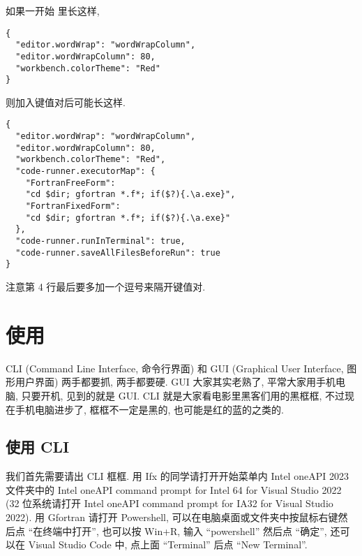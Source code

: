 如果一开始  里长这样,
\begin{verbatim}
{
  "editor.wordWrap": "wordWrapColumn",
  "editor.wordWrapColumn": 80,
  "workbench.colorTheme": "Red"
}
\end{verbatim}
则加入键值对后可能长这样.
\begin{verbatim}
{
  "editor.wordWrap": "wordWrapColumn",
  "editor.wordWrapColumn": 80,
  "workbench.colorTheme": "Red",
  "code-runner.executorMap": {
    "FortranFreeForm":
    "cd $dir; gfortran *.f*; if($?){.\a.exe}",
    "FortranFixedForm":
    "cd $dir; gfortran *.f*; if($?){.\a.exe}"
  },
  "code-runner.runInTerminal": true,
  "code-runner.saveAllFilesBeforeRun": true
}
\end{verbatim}
注意第 4 行最后要多加一个逗号来隔开键值对.

\section{使用}

CLI (Command Line Interface, 命令行界面) 和 GUI (Graphical User Interface, 图形用户界面) 两手都要抓, 两手都要硬. GUI 大家其实老熟了, 平常大家用手机电脑, 只要开机, 见到的就是 GUI. CLI 就是大家看电影里黑客们用的黑框框, 不过现在手机电脑进步了, 框框不一定是黑的, 也可能是红的蓝的之类的.

\subsection{使用 CLI}\label{use_ifx}\label{use_gfortran}

我们首先需要请出 CLI 框框. 用 Ifx 的同学请打开开始菜单内 Intel oneAPI 2023 文件夹中的 Intel oneAPI command prompt for Intel 64 for Visual Studio 2022 (32 位系统请打开 Intel oneAPI command prompt for IA32 for Visual Studio 2022). 用 Gfortran 请打开 Powershell, 可以在电脑桌面或文件夹中按鼠标右键然后点 ``在终端中打开'', 也可以按 Win+R, 输入 ``powershell'' 然后点 ``确定'', 还可以在 Visual Studio Code 中, 点上面 ``Terminal'' 后点 ``New Terminal''.

